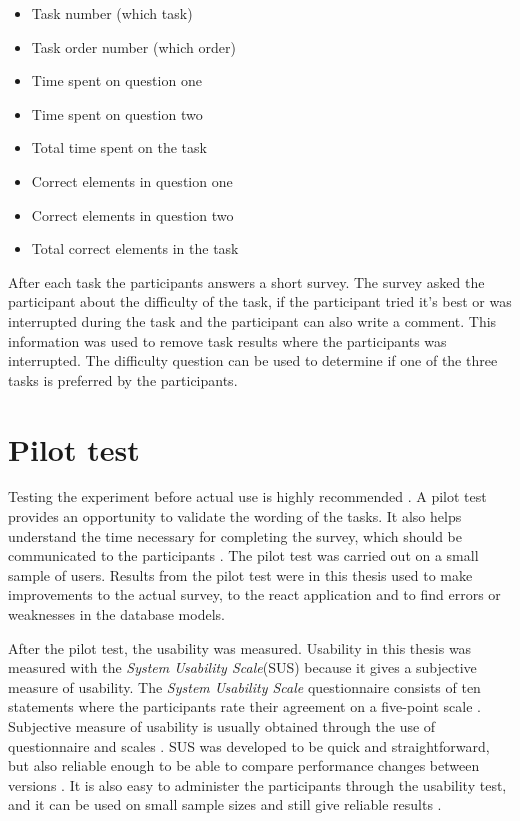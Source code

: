 \begin{itemize}
	\item Task number (which task)
	\item Task order number (which order)
	\item Time spent on question one 
	\item Time spent on question two
	\item Total time spent on the task
	\item Correct elements in question one
	\item Correct elements in question two
	\item Total correct elements in the task
\end{itemize}
\vspace{0.2cm}

After each task the participants answers a short survey. The survey asked the participant about the difficulty of the task, if the participant tried it's best or was interrupted during the task and the participant can also write a comment. This information was used to remove task results where the participants was interrupted. The difficulty question can be used to determine if one of the three tasks is preferred by the participants. 

\section{Pilot test}
Testing the experiment before actual use is highly recommended \citep{Ben2009}. A pilot test provides an opportunity to validate the wording of the tasks. It also helps understand the time necessary for completing the survey, which should be communicated to the participants \citep{Schade2015}. The pilot test was carried out on a small sample of users. Results from the pilot test were in this thesis used to make improvements to the actual survey, to the react application and to find errors or weaknesses in the database models.

After the pilot test, the usability was measured. Usability in this thesis was measured with the \textit{System Usability Scale}(SUS) because it gives a subjective measure of usability. The \textit{System Usability Scale} questionnaire consists of ten statements where the participants rate their agreement on a five-point scale \citep{Ben2009}. Subjective measure of usability is usually obtained through the use of questionnaire and scales \citep{Brooke1996}. SUS was developed to be quick and straightforward, but also reliable enough to be able to compare performance changes between versions \citep{Brooke1996}. It is also easy to administer the participants through the usability test, and it can be used on small sample sizes and still give reliable results \citep{Affairs2013}.  

